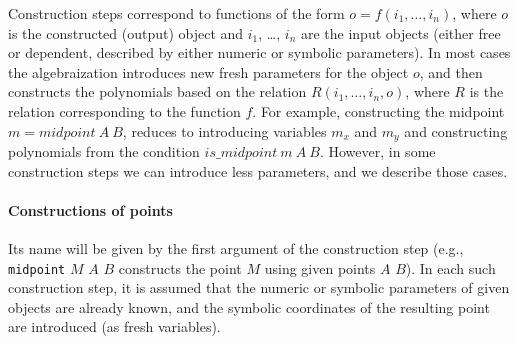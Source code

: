 \documentclass[final,1p,times,authoryear]{elsarticle}
\begin{document}
Construction steps correspond to functions of the form $o = f(i_1,
\ldots, i_n)$, where $o$ is the constructed (output) object and $i_1$,
\ldots, $i_n$ are the input objects (either free or dependent,
described by either numeric or symbolic parameters). In most cases the
algebraization introduces new fresh parameters for the object $o$, and
then constructs the polynomials based on the relation $R(i_1, \ldots,
i_n, o)$, where $R$ is the relation corresponding to the function $f$.
For example, constructing the midpoint $m = midpoint\ A\ B$, reduces
to introducing variables $m_x$ and $m_y$ and constructing polynomials
from the condition $is\_midpoint\ m\ A\ B$.  However, in some construction
steps we can introduce less parameters, and we describe those cases.

\paragraph{Constructions of points}

Its name will be given by the first argument of the construction step
(e.g., {\tt midpoint} $M$ $A$ $B$ constructs the point $M$ using given
points $A$ $B$). In each such construction step, it is assumed that
the numeric or symbolic parameters of given objects are already known,
and the symbolic coordinates of the resulting point are introduced (as
fresh variables).
\end{document}
